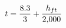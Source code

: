 \documentclass[preview]{standalone}
\begin{document}
\begin{align*}
t = { 8.3 \over 3 } + { h_{ ft } \over 2{,}000 }
\end{align*}
\end{document}
